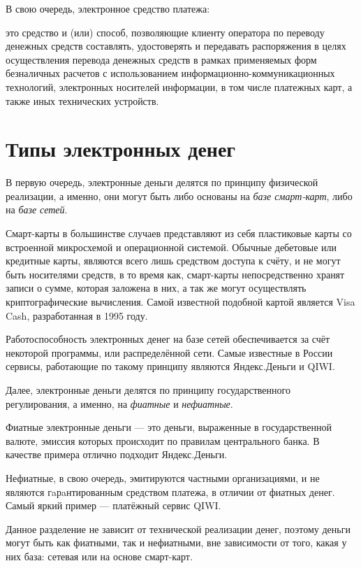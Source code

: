 \documentclass[12pt,a4paper]{article}
\begin{document}
В свою очередь, электронное средство платежа:

\begin{displayquote}
	это средство и (или) способ, позволяющие клиенту оператора по переводу денежных средств составлять, удостоверять и передавать распоряжения в целях осуществления перевода денежных средств в рамках применяемых форм безналичных расчетов с использованием информационно-коммуникационных технологий, электронных носителей информации, в том числе платежных карт, а также иных технических устройств.\cite[статья~3~пункт~18]{cite1} 
\end{displayquote}

\section{Типы электронных денег}

В первую очередь, электронные деньги делятся по принципу физической реализации, а именно, они могут быть либо основаны на \textit{базе смарт-карт}, либо на \textit{базе сетей}. 

Смарт-карты в большинстве случаев представляют из себя пластиковые карты со встроенной микросхемой и операционной системой. Обычные дебетовые или кредитные карты, являются всего лишь средством доступа к счёту, и не могут быть носителями средств, в то время как, смарт-карты непосредственно хранят записи о сумме, которая заложена в них, а так же могут осуществлять криптографические вычисления. Самой известной подобной картой является Visa Cash, разработанная в 1995 году.

Работоспособность электронных денег на базе сетей обеспечивается за счёт некоторой программы, или распределённой сети. Самые известные в России сервисы, работающие по такому принципу являются Яндекс.Деньги и QIWI.

Далее, электронные деньги делятся по принципу государственного регулирования, а именно, на \textit{фиатные} и \textit{нефиатные}.

Фиатные электронные деньги --- это деньги, выраженные в государственной валюте, эмиссия которых происходит по правилам центрального банка. В качестве примера отлично подходит Яндекс.Деньги.

Нефиатные, в свою очередь, эмитируются частными организациями, и не являются гaрaнтированным средством платежа, в отличии от фиатных денег. Самый яркий пример --- платёжный сервис QIWI.

Данное разделение не зависит от технической реализации денег, поэтому деньги могут быть как фиатными, так и нефиатными, вне зависимости от того, какая у них база: сетевая или на основе смарт-карт.
\end{document}
